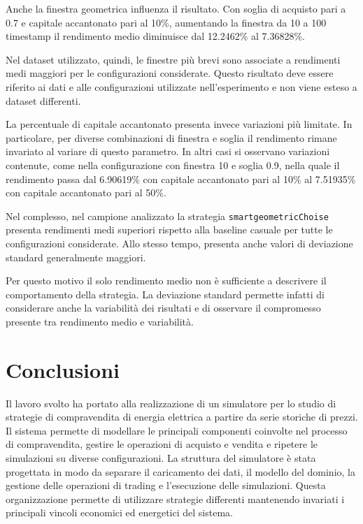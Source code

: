 \documentclass[12pt,a4paper,oneside]{report}
\begin{document}
Anche la finestra geometrica influenza il risultato. Con soglia di acquisto
pari a 0.7 e capitale accantonato pari al 10\%, aumentando la finestra da 10
a 100 timestamp il rendimento medio diminuisce dal 12.2462\% al 7.36828\%.

Nel dataset utilizzato, quindi, le finestre più brevi sono associate a
rendimenti medi maggiori per le configurazioni considerate. Questo risultato
deve essere riferito ai dati e alle configurazioni utilizzate nell'esperimento
e non viene esteso a dataset differenti.

La percentuale di capitale accantonato presenta invece variazioni più
limitate. In particolare, per diverse combinazioni di finestra e soglia il
rendimento rimane invariato al variare di questo parametro. In altri casi si
osservano variazioni contenute, come nella configurazione con finestra 10 e
soglia 0.9, nella quale il rendimento passa dal 6.90619\% con capitale
accantonato pari al 10\% al 7.51935\% con capitale accantonato pari al 50\%.

Nel complesso, nel campione analizzato la strategia
\texttt{smartgeometricChoise} presenta rendimenti medi superiori rispetto
alla baseline casuale per tutte le configurazioni considerate. Allo stesso
tempo, presenta anche valori di deviazione standard generalmente maggiori.

Per questo motivo il solo rendimento medio non è sufficiente a descrivere il
comportamento della strategia. La deviazione standard permette infatti di
considerare anche la variabilità dei risultati e di osservare il compromesso
presente tra rendimento medio e variabilità.
\chapter{Conclusioni}

\label{chap:conclusions}

Il lavoro svolto ha portato alla realizzazione di un simulatore per lo studio
di strategie di compravendita di energia elettrica a partire da serie storiche
di prezzi. Il sistema permette di modellare le principali componenti coinvolte
nel processo di compravendita, gestire le operazioni di acquisto e vendita e
ripetere le simulazioni su diverse configurazioni.
La struttura del simulatore è stata progettata in modo da separare il caricamento
dei dati, il modello del dominio, la gestione delle operazioni di trading
e l'esecuzione delle simulazioni. Questa organizzazione permette di utilizzare
strategie differenti mantenendo invariati i principali vincoli economici ed energetici del sistema.
\end{document}
